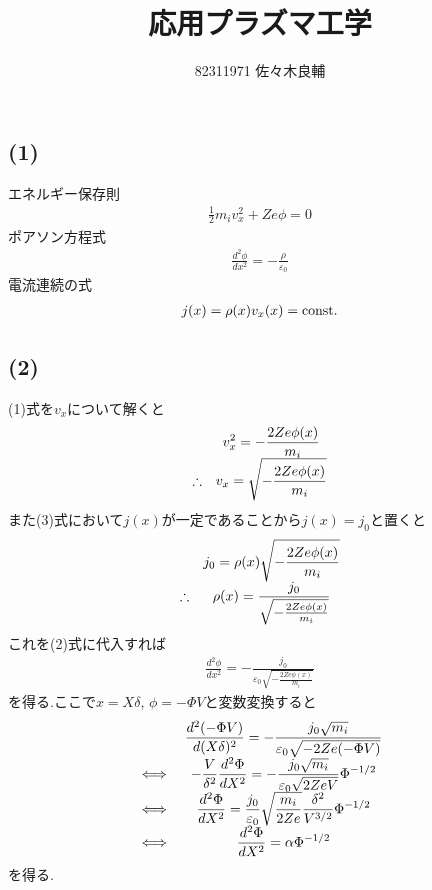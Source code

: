 \documentclass[uplatex,a4j,11pt,dvipdfmx]{jsarticle}
\begin{document}
\title{応用プラズマ工学}
\author{82311971 佐々木良輔}
\date{}
\maketitle
\subsection*{(1)}
エネルギー保存則
\begin{align}
  \frac{1}{2}m_iv_x^2+Ze\phi=0
\end{align}
ポアソン方程式
\begin{align}
  \frac{d^2\phi}{dx^2}=-\frac{\rho}{\varepsilon_0}
\end{align}
電流連続の式
\begin{align}
  j(x)=\rho(x)v_x(x)={\rm const.}
\end{align}
\subsection*{(2)}
(1)式を$v_x$について解くと
\begin{align}
  \everymath{\displaystyle}
  \begin{array}{cc}
    &v_x^2=-\frac{2Ze\phi(x)}{m_i}\\
    \therefore&v_x=\sqrt{-\frac{2Ze\phi(x)}{m_i}}
  \end{array}
\end{align}
また(3)式において$j(x)$が一定であることから$j(x)=j_0$と置くと
\begin{align}
  \everymath{\displaystyle}
  \begin{array}{cc}
    &j_0=\rho(x)\sqrt{-\frac{2Ze\phi(x)}{m_i}}\\
    \therefore&\rho(x)=\frac{j_0}{\sqrt{-\frac{2Ze\phi(x)}{m_i}}}
  \end{array}
\end{align}
これを(2)式に代入すれば
\begin{align}
  \frac{d^2\phi}{dx^2}=-\frac{j_0}{\varepsilon_0\sqrt{-\frac{2Ze\phi(x)}{m_i}}}
\end{align}
を得る.ここで$x=X\delta$, $\phi=-\Phi V$と変数変換すると
\begin{align}
  \everymath{\displaystyle}
  \begin{array}{cc}
    &\frac{d^2(-\Phi V)}{d(X\delta)^2}=-\frac{j_0\sqrt{m_i}}{\varepsilon_0\sqrt{-2Ze(-\Phi V)}}\\
    \iff&-\frac{V}{\delta^2}\frac{d^2\Phi}{dX^2}=-\frac{j_0\sqrt{m_i}}{\varepsilon_0\sqrt{2ZeV}}\Phi^{-1/2}\\
    \iff&\frac{d^2\Phi}{dX^2}=\frac{j_0}{\varepsilon_0}\sqrt{\frac{m_i}{2Ze}}\frac{\delta^2}{V^{3/2}}\Phi^{-1/2}\\
    \iff&\frac{d^2\Phi}{dX^2}=\alpha\Phi^{-1/2}
  \end{array}
\end{align}
を得る.
\end{document}
